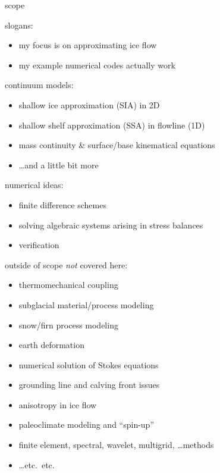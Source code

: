 
\begin{frame}{scope}

slogans:
  \begin{itemize}
  \item \alert{my focus is on approximating ice flow}
  \item \alert{my example numerical codes actually work}
  \end{itemize}
\medskip

continuum models:
  \begin{itemize}
  \item shallow ice approximation (SIA) in 2D
  \item shallow shelf approximation (SSA) in flowline (1D)
  \item mass continuity \& surface/base kinematical equations
  \item \dots and a little bit more
  \end{itemize}

\medskip
numerical ideas:
  \begin{itemize}
  \item finite difference schemes
  \item solving algebraic systems arising in stress balances
  \item verification
  \end{itemize}
\end{frame}


\begin{frame}{outside of scope}
\large\emph{not} \normalsize covered here:
  \begin{itemize}
  \item thermomechanical coupling
  \item subglacial material/process modeling
  \item snow/firn process modeling
  \item earth deformation
  \item numerical solution of Stokes equations
  \item grounding line and calving front issues
  \item anisotropy in ice flow
  \item paleoclimate modeling and ``spin-up''
  \item finite element, spectral, wavelet, multigrid, \dots methods
  \item \dots etc.~etc.
  \end{itemize}
\end{frame}


